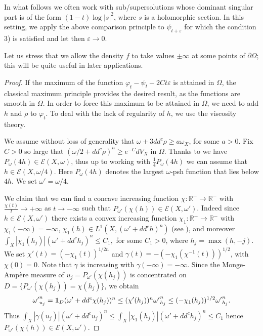 \documentclass[10pt,a4paper]{amsart}
\numberwithin{equation}{section}
\begin{document}
In what follows we often work with sub/supersolutions whose dominant singular part is of the form $(1-t)\log |s|^2$, where $s$ is a holomorphic section.
 In this setting, we apply the above comparison principle to $\psi_{t+\varepsilon}$ 
 for which the condition 3) is satisfied and let then $\varepsilon\to 0$.  

\smallskip

Let us stress that we allow the density $f$ to take values $\pm \infty$ at some points of $\partial \Omega$; this will be  quite useful in later applications.


\begin{proof}
If the maximum of the function $\varphi_t-\psi_t-2Ct\varepsilon$ is attained in $\Omega$,  the classical maximum principle provides the desired result, as the functions are smooth in $\Omega$. In order to force this maximum to be attained in $\Omega$, we need to add $h$ and $\rho$ to $\varphi_t$.  To deal with 
the lack of regularity of $h$, we use the  viscosity theory.  

 
We assume without loss of generality that $\omega +3dd^c \rho\geq a\omega_X$, for some $a>0$. Fix $C>0$ so large that $(\omega/2+dd^c \rho)^n \geq e^{-C}dV_X$ in $\Omega$. 
Thanks to \cite[Proposition 2.5]{ALS24} we have $P_\omega (4h)\in \mathcal{E}(X,\omega)$,
thus up to working with $\frac{1}{4}P_\omega (4h) $ we can assume that $h\in \mathcal{E}(X, \omega/4)$. Here $P_\omega (4h)$ denotes the largest $\omega$-psh function that lies below $4h$. 
We set $\omega'=\omega/4$.



We claim that we can find a concave increasing function $\chi : \mathbb R^- \rightarrow \mathbb R^-$ with 
$\frac{\chi(t)}{t} \to +\infty$ as $t\to -\infty$ such that $P_{\omega'}(\chi(h)) \in \mathcal{E}(X,\omega')$.
Indeed since $h \in {\mathcal E}(X,\omega')$ there exists a convex increasing function 
$\chi_1: \mathbb R^- \rightarrow \mathbb R^-$ with $\chi_1(-\infty)=-\infty$, $\chi_1(h)\in L^1(X,(\omega'+dd^c h)^n)$
(see \cite[Proposition 2.2]{GZ07}), and moreover
$
\int_X |\chi_1(h_j)| (\omega' +dd^c h_j)^n \leq C_1,
$
for some  $C_1>0$, where $h_j=\max(h,-j)$. 
We set $\chi'(t)=(-\chi_1(t))^{1/2n}$ and $\gamma(t)= -(-\chi_1(\chi^{-1}(t)))^{1/2}$,
with $\chi(0)=0$. Note that $\gamma$ is  increasing  with $\gamma(-\infty)=-\infty$. 
Since the Monge-Amp\`ere measure of $u_j= P_{\omega' }(\chi(h_j))$ is concentrated on 
 $D=\{P_{\omega'}(\chi(h_j))= \chi(h_j)\}$, we obtain
$$
{\omega'}_{u_j}^n = {\bf 1}_D (\omega'+dd^c \chi(h_j))^n 
\leq  (\chi'(h_j))^n {\omega'}_{h_j}^n \leq (-\chi_1(h_j))^{1/2}  {\omega'}_{h_j}^n.
$$ 
Thus 
$
 \int_X |\gamma(u_j)|(\omega'+dd^c u_j)^n \leq \int_X |\chi_1(h_j)| (\omega' +dd^c h_j)^n \leq C_1
$
hence $P_{\omega'}( \chi(h)) \in \mathcal{E} (X, \omega')$.


\end{proof}
\end{document}
